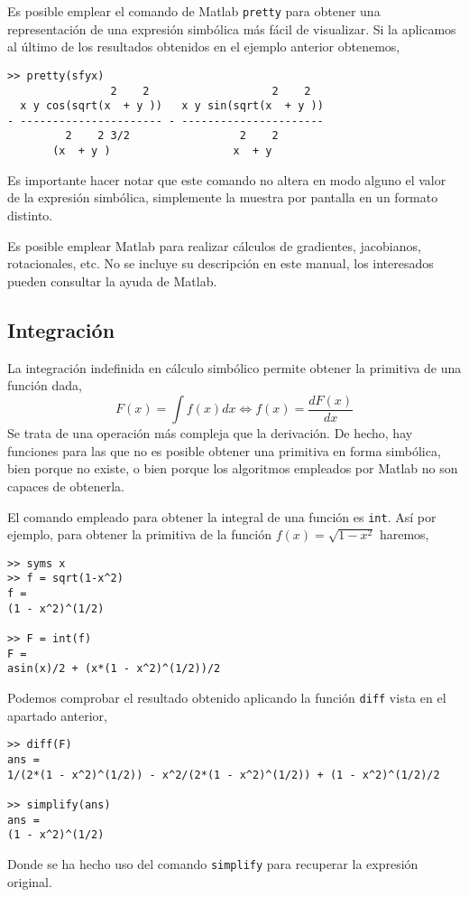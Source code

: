Es posible emplear el comando de Matlab \texttt{pretty} para obtener una representación de una expresión simbólica más fácil de visualizar. Si la aplicamos al último de los resultados obtenidos en el ejemplo anterior obtenemos,

\begin{verbatim}
>> pretty(sfyx)
                2    2                   2    2
  x y cos(sqrt(x  + y ))   x y sin(sqrt(x  + y ))
- ---------------------- - ----------------------
         2    2 3/2                 2    2
       (x  + y )                   x  + y
\end{verbatim}

Es importante hacer notar que este comando no altera en modo alguno el valor de la expresión simbólica, simplemente la muestra por pantalla en un formato distinto.

Es posible emplear Matlab para realizar cálculos de gradientes, jacobianos, rotacionales, etc. No se incluye su descripción en este manual, los interesados pueden consultar la ayuda de Matlab.


\subsection{Integración} 
La integración indefinida en cálculo simbólico permite obtener la primitiva de una función dada,
\begin{equation*}
F(x) = \int f(x)dx  \Leftrightarrow f(x) = \frac{dF(x)}{dx}  
\end{equation*}
Se trata de una operación más compleja que la derivación. De hecho, hay funciones para las que no es posible obtener una primitiva en forma simbólica, bien porque no existe, o bien porque los algoritmos empleados por Matlab no son capaces de obtenerla.

El comando empleado para obtener la integral de una función es \texttt{int}. Así por ejemplo, para obtener la primitiva de la función $f(x) = \sqrt{1-x^2}$ haremos,
\begin{verbatim}
>> syms x
>> f = sqrt(1-x^2) 
f = 
(1 - x^2)^(1/2)
 
>> F = int(f)
F = 
asin(x)/2 + (x*(1 - x^2)^(1/2))/2
\end{verbatim}
Podemos comprobar el resultado obtenido aplicando la función \texttt{diff} vista en el apartado anterior,

\begin{verbatim}
>> diff(F) 
ans = 
1/(2*(1 - x^2)^(1/2)) - x^2/(2*(1 - x^2)^(1/2)) + (1 - x^2)^(1/2)/2
 
>> simplify(ans) 
ans = 
(1 - x^2)^(1/2)
\end{verbatim}
Donde se ha hecho uso del comando \texttt{simplify} para recuperar la expresión original.


